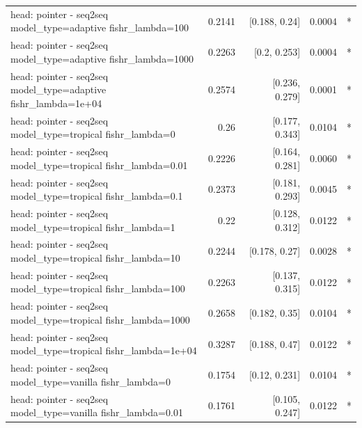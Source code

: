 \documentclass[10pt]{article}
\makeatletter
\newcommand{\stackcell}[1]{\begin{tabular}[t]{@{}l@{}}#1\end{tabular}}
\makeatother
\begin{document}
{\begin{longtable}{lrrrl}
\stackcell{head: pointer - seq2seq\\\footnotesize model\_type=adaptive fishr\_lambda=100 } & 0.2141 & [0.188, 0.24] & 0.0004 & *\\
\stackcell{head: pointer - seq2seq\\\footnotesize model\_type=adaptive fishr\_lambda=1000 } & 0.2263 & [0.2, 0.253] & 0.0004 & *\\
\stackcell{head: pointer - seq2seq\\\footnotesize model\_type=adaptive fishr\_lambda=1e+04 } & 0.2574 & [0.236, 0.279] & 0.0001 & *\\
\stackcell{head: pointer - seq2seq\\\footnotesize model\_type=tropical fishr\_lambda=0 } & 0.26 & [0.177, 0.343] & 0.0104 & *\\
\stackcell{head: pointer - seq2seq\\\footnotesize model\_type=tropical fishr\_lambda=0.01 } & 0.2226 & [0.164, 0.281] & 0.0060 & *\\
\stackcell{head: pointer - seq2seq\\\footnotesize model\_type=tropical fishr\_lambda=0.1 } & 0.2373 & [0.181, 0.293] & 0.0045 & *\\
\stackcell{head: pointer - seq2seq\\\footnotesize model\_type=tropical fishr\_lambda=1 } & 0.22 & [0.128, 0.312] & 0.0122 & *\\
\stackcell{head: pointer - seq2seq\\\footnotesize model\_type=tropical fishr\_lambda=10 } & 0.2244 & [0.178, 0.27] & 0.0028 & *\\
\stackcell{head: pointer - seq2seq\\\footnotesize model\_type=tropical fishr\_lambda=100 } & 0.2263 & [0.137, 0.315] & 0.0122 & *\\
\stackcell{head: pointer - seq2seq\\\footnotesize model\_type=tropical fishr\_lambda=1000 } & 0.2658 & [0.182, 0.35] & 0.0104 & *\\
\stackcell{head: pointer - seq2seq\\\footnotesize model\_type=tropical fishr\_lambda=1e+04 } & 0.3287 & [0.188, 0.47] & 0.0122 & *\\
\stackcell{head: pointer - seq2seq\\\footnotesize model\_type=vanilla fishr\_lambda=0 } & 0.1754 & [0.12, 0.231] & 0.0104 & *\\
\stackcell{head: pointer - seq2seq\\\footnotesize model\_type=vanilla fishr\_lambda=0.01 } & 0.1761 & [0.105, 0.247] & 0.0122 & *\\

\end{longtable}}
\end{document}
